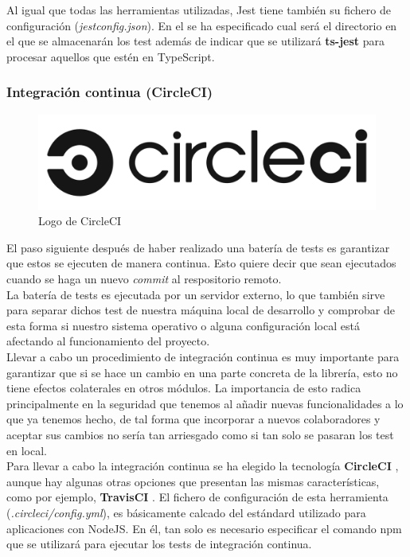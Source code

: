  Al igual que todas las herramientas utilizadas, Jest tiene también su fichero de configuración (\textit{jestconfig.json}). En el se ha especificado cual será el directorio en el que se almacenarán los test además de indicar que se utilizará \textbf{ts-jest} para procesar aquellos que estén en TypeScript.
 
 \subsubsection{Integración continua (CircleCI)}
 
 \begin{figure}[ht]
    \centering
    \includegraphics[scale=0.15]{mem/images/cap-4/4.1.2(desarrollo)/circleci-logo.png}
    \caption{Logo de CircleCI}
    \label{fig:circleci}
\end{figure}
 
 El paso siguiente después de haber realizado una batería de tests es garantizar que estos se ejecuten de manera continua. Esto quiere decir que sean ejecutados cuando se haga un nuevo \textit{commit} al respositorio remoto. \\
 
 La batería de tests es ejecutada por un servidor externo, lo que también sirve para separar dichos test de nuestra máquina local de desarrollo y comprobar de esta forma si nuestro sistema operativo o alguna configuración local está afectando al funcionamiento del proyecto. \\
 
 Llevar a cabo un procedimiento de integración continua es muy importante para garantizar que si se hace un cambio en una parte concreta de la librería, esto no tiene efectos colaterales en otros módulos. La importancia de esto radica principalmente en la seguridad que tenemos al añadir nuevas funcionalidades a lo que ya tenemos hecho, de tal forma que incorporar a nuevos colaboradores y aceptar sus cambios no sería tan arriesgado como si tan solo se pasaran los test en local.\\
 
 Para llevar a cabo la integración continua se ha elegido la tecnología \textbf{CircleCI} \cite{circleci}, aunque hay algunas otras opciones que presentan las mismas características, como por ejemplo, \textbf{TravisCI} \cite{travis}. El fichero de configuración de esta herramienta (\textit{.circleci/config.yml}), es básicamente calcado del estándard utilizado para aplicaciones con NodeJS. En él, tan solo es necesario especificar el comando npm que se utilizará para ejecutar los tests de integración continua.
 
